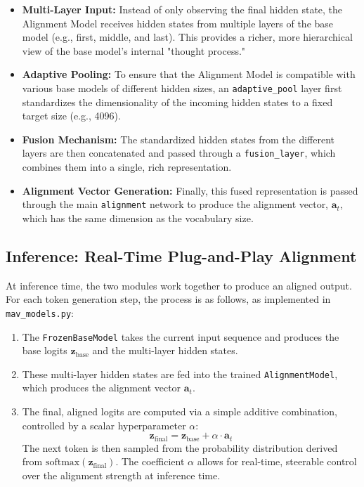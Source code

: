 \documentclass{article} %
\begin{document}
\begin{itemize}
    \item \textbf{Multi-Layer Input:} Instead of only observing the final hidden state, the Alignment Model receives hidden states from multiple layers of the base model (e.g., first, middle, and last). This provides a richer, more hierarchical view of the base model's internal "thought process."
    \item \textbf{Adaptive Pooling:} To ensure that the Alignment Model is compatible with various base models of different hidden sizes, an \texttt{adaptive\_pool} layer first standardizes the dimensionality of the incoming hidden states to a fixed target size (e.g., 4096).
    \item \textbf{Fusion Mechanism:} The standardized hidden states from the different layers are then concatenated and passed through a \texttt{fusion\_layer}, which combines them into a single, rich representation.
    \item \textbf{Alignment Vector Generation:} Finally, this fused representation is passed through the main \texttt{alignment} network to produce the alignment vector, $\mathbf{a}_t$, which has the same dimension as the vocabulary size.
\end{itemize}

\subsection{Inference: Real-Time Plug-and-Play Alignment}

At inference time, the two modules work together to produce an aligned output. For each token generation step, the process is as follows, as implemented in \texttt{mav\_models.py}:
\begin{enumerate}
    \item The \texttt{FrozenBaseModel} takes the current input sequence and produces the base logits $\mathbf{z}_{\text{base}}$ and the multi-layer hidden states.
    \item These multi-layer hidden states are fed into the trained \texttt{AlignmentModel}, which produces the alignment vector $\mathbf{a}_t$.
    \item The final, aligned logits are computed via a simple additive combination, controlled by a scalar hyperparameter $\alpha$:
    \begin{equation}
        \mathbf{z}_{\text{final}} = \mathbf{z}_{\text{base}} + \alpha \cdot \mathbf{a}_t
    \end{equation}
    The next token is then sampled from the probability distribution derived from $\text{softmax}(\mathbf{z}_{\text{final}})$. The coefficient $\alpha$ allows for real-time, steerable control over the alignment strength at inference time.
\end{enumerate}
\end{document}
